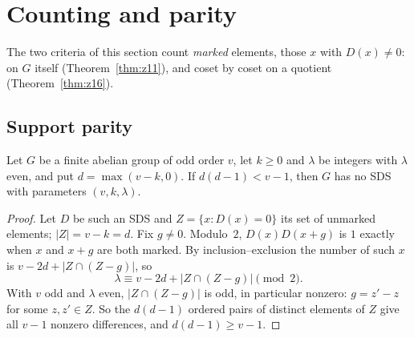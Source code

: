 
\section{Counting and parity}\label{sec:counting}

The two criteria of this section count \emph{marked} elements, those $x$ with $D(x) \ne 0$:
on $G$ itself (Theorem~\ref{thm:z11}), and coset by coset on a quotient
(Theorem~\ref{thm:z16}).

\subsection{Support parity}

\begin{theorem}\label{thm:z11}
Let $G$ be a finite abelian group of odd order $v$, let $k \ge 0$ and $\lambda$ be integers with
$\lambda$ even, and put $d = \max(v - k, 0)$. If $d(d - 1) < v - 1$, then $G$ has no SDS with
parameters $(v,k,\lambda)$.
\end{theorem}

\begin{proof}
Let $D$ be such an SDS and $Z = \{x : D(x) = 0\}$ its set of unmarked elements; $|Z| = v - k = d$.
Fix $g \ne 0$. Modulo~$2$, $D(x) D(x+g)$ is $1$ exactly when $x$ and $x + g$ are both marked. By
inclusion--exclusion the number of such $x$ is $v - 2d + |Z \cap (Z - g)|$, so
\[
  \lambda \equiv v - 2d + |Z \cap (Z - g)| \pmod 2 .
\]
With $v$ odd and $\lambda$ even, $|Z \cap (Z - g)|$ is odd, in particular nonzero: $g = z' - z$
for some $z, z' \in Z$. So the $d(d-1)$ ordered pairs of distinct elements of $Z$ give all
$v - 1$ nonzero differences, and $d(d - 1) \ge v - 1$.
\end{proof}

